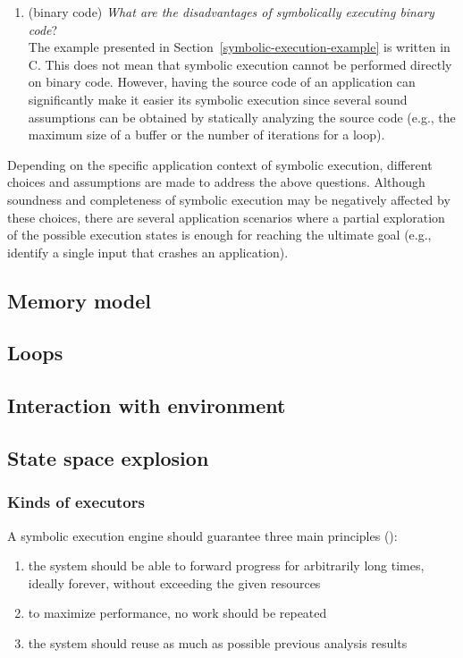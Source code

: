 \documentclass[10pt, a4paper]{article}
\begin{document}
\begin{enumerate}
  \item (binary code) {\em What are the disadvantages of symbolically executing binary code}? \\
  The example presented in Section~\ref{symbolic-execution-example} is written in C. This does not mean that symbolic execution cannot be performed directly on binary code. However, having the source code of an application can significantly make it easier its symbolic execution since several sound assumptions can be obtained by statically analyzing the source code (e.g., the maximum size of a buffer or the number of iterations for a loop).
   
\end{enumerate}
Depending on the specific application context of symbolic execution, different choices and assumptions are made to address the above questions. Although soundness and completeness of symbolic execution may be negatively affected by these choices, there are several application scenarios where a partial exploration of the possible execution states is enough for reaching the ultimate goal (e.g., identify a single input that crashes an application).

\subsection{Memory model}
\subsection{Loops}
\subsection{Interaction with environment}

\subsection{State space explosion}


\subsubsection{Kinds of executors}
A symbolic execution engine should guarantee three main principles (\cite{MAYHEM-SP12}):
\begin{enumerate}
  \item the system should be able to forward progress for arbitrarily long times, ideally forever, without exceeding the given resources
  \item to maximize performance, no work should be repeated
  \item the system should reuse as much as possible previous analysis results
\end{enumerate}
\end{document}
